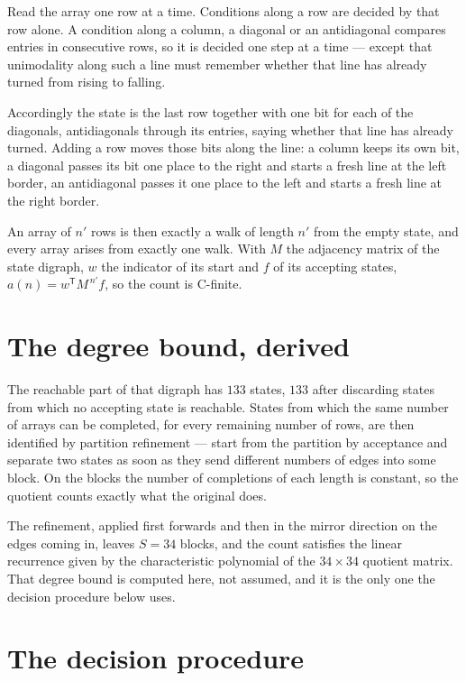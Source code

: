 \documentclass[11pt]{article}
\theoremstyle{definition}
\begin{document}
Read the array one row at a time. Conditions along a row are decided by that row alone. A condition along a column, a diagonal or an antidiagonal compares entries in consecutive rows, so it is decided one step at a time --- except that unimodality along such a line must remember whether that line has already turned from rising to falling.

Accordingly the state is the last row together with one bit for each of the diagonals, antidiagonals through its entries, saying whether that line has already turned. Adding a row moves those bits along the line: a column keeps its own bit, a diagonal passes its bit one place to the right and starts a fresh line at the left border, an antidiagonal passes it one place to the left and starts a fresh line at the right border.

An array of $n'$ rows is then exactly a walk of length $n'$ from the empty state, and every array arises from exactly one walk. With $M$ the adjacency matrix of the state digraph, $w$ the indicator of its start and $f$ of its accepting states, $a(n) = w^{\mathsf T}M^{\,n'}f$, so the count is C-finite.

\section{The degree bound, derived}

The reachable part of that digraph has $133$ states, $133$ after discarding states from which no accepting state is reachable. States from which the same number of arrays can be completed, for every remaining number of rows, are then identified by partition refinement --- start from the partition by acceptance and separate two states as soon as they send different numbers of edges into some block. On the blocks the number of completions of each length is constant, so the quotient counts exactly what the original does.

The refinement, applied first forwards and then in the mirror direction on the edges coming in, leaves $S = 34$ blocks, and the count satisfies the linear recurrence given by the characteristic polynomial of the $34 \times 34$ quotient matrix. That degree bound is computed here, not assumed, and it is the only one the decision procedure below uses.

\section{The decision procedure}
\end{document}
